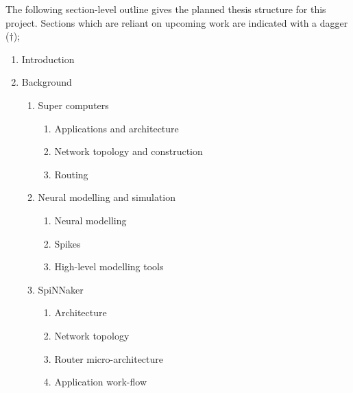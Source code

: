 The following section-level outline gives the planned thesis structure
for this project. Sections which are reliant on upcoming work are
indicated with a dagger (\(\dagger\));

\begin{enumerate}
	
	\item Introduction
	
	\item Background
	\begin{enumerate}
		\item Super computers
		\begin{enumerate}
			\item Applications and architecture
			\item Network topology and construction
			\item Routing
		\end{enumerate}
		
		\item Neural modelling and simulation
		\begin{enumerate}
			\item Neural modelling
			\item Spikes
			\item High-level modelling tools
		\end{enumerate}
		
		\item SpiNNaker
		\begin{enumerate}
			\item Architecture
			\item Network topology
			\item Router micro-architecture
			\item Application work-flow
		\end{enumerate}
	\end{enumerate}
	

\end{enumerate}
